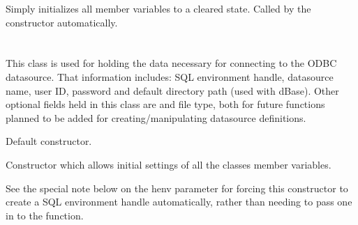 \label{wxdbcolinfinitialize}

Simply initializes all member variables to a cleared state.  Called by
the constructor automatically.

\section{}\label{wxdbconnectinf}

This class is used for holding the data necessary for connecting to the ODBC
datasource.  That information includes: SQL environment handle, datasource
name, user ID, password and default directory path (used with dBase).  Other
optional fields held in this class are and file type, both for future
functions planned to be added for creating/manipulating datasource definitions.

\label{wxdbconnectinfctor}


Default constructor.


Constructor which allows initial settings of all the classes member variables.

See the special note below on the henv parameter for forcing this constructor
to create a SQL environment handle automatically, rather than needing to pass
one in to the function.


